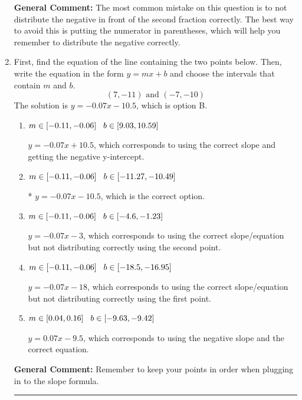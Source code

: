 \documentclass{extbook}[14pt]
\newcommand{\litem}[1]{\item #1

\rule{\textwidth}{0.4pt}}
\begin{document}
\begin{enumerate}
{\textbf{General Comment:} The most common mistake on this question is to not distribute the negative in front of the second fraction correctly. The best way to avoid this is putting the numerator in parentheses, which will help you remember to distribute the negative correctly.
}
\litem{
First, find the equation of the line containing the two points below. Then, write the equation in the form $ y=mx+b $ and choose the intervals that contain $m$ and $b$.
\[ (7, -11) \text{ and } (-7, -10) \]The solution is \( y = -0.07x -10.5 \), which is option B.\begin{enumerate}[label=\Alph*.]
\item \( m \in [-0.11, -0.06] \hspace*{3mm} b \in [9.03, 10.59] \)

 $y = -0.07x + 10.5$, which corresponds to using the correct slope and getting the negative y-intercept.
\item \( m \in [-0.11, -0.06] \hspace*{3mm} b \in [-11.27, -10.49] \)

* $y = -0.07x -10.5$, which is the correct option.
\item \( m \in [-0.11, -0.06] \hspace*{3mm} b \in [-4.6, -1.23] \)

 $y = -0.07x -3$, which corresponds to using the correct slope/equation but not distributing correctly using the second point.
\item \( m \in [-0.11, -0.06] \hspace*{3mm} b \in [-18.5, -16.95] \)

 $y = -0.07x -18$, which corresponds to using the correct slope/equation but not distributing correctly using the first point.
\item \( m \in [0.04, 0.16] \hspace*{3mm} b \in [-9.63, -9.42] \)

 $y = 0.07x -9.5$, which corresponds to using the negative slope and the correct equation.
\end{enumerate}

\textbf{General Comment:} Remember to keep your points in order when plugging in to the slope formula.
}
\end{enumerate}
\end{document}
